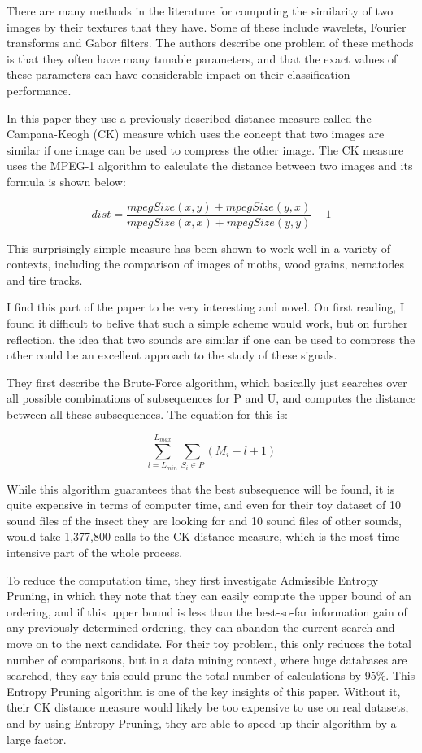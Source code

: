 There are many methods in the literature for computing the similarity
of two images by their textures that they have.  Some of these include
wavelets, Fourier transforms and Gabor filters.  The authors describe
one problem of these methods is that they often have many tunable
parameters, and that the exact values of these parameters can have
considerable impact on their classification performance.

In this paper they use a previously described distance measure called
the Campana-Keogh (CK) measure \cite{campana2010} which uses the
concept that two images are similar if one image can be used to
compress the other image.  The CK measure uses the MPEG-1 algorithm to
calculate the distance between two images and its formula is shown
below:

	\[ dist = \frac{mpegSize(x,y) + mpegSize(y,x)} {mpegSize(x,x) + mpegSize(y,y)} - 1 \]

This surprisingly simple measure has been shown to work well in a
variety of contexts, including the comparison of images of moths, wood
grains, nematodes and tire tracks\cite{campana2010}.

I find this part of the paper to be very interesting and novel.  On
first reading, I found it difficult to belive that such a simple
scheme would work, but on further reflection, the idea that two sounds
are similar if one can be used to compress the other could be an
excellent approach to the study of these signals.

They first describe the Brute-Force algorithm, which basically just
searches over all possible combinations of subsequences for P and U,
and computes the distance between all these subsequences.  The
equation for this is:

	\[ \sum^{L_{max}}_{l=L_{min}} \sum_{S_i \in { P }} (M_i - l + 1) \]

While this algorithm guarantees that the best subsequence will be
found, it is quite expensive in terms of computer time, and even for
their toy dataset of 10 sound files of the insect they are looking for
and 10 sound files of other sounds, would take 1,377,800 calls to the
CK distance measure, which is the most time intensive part of the
whole process.

To reduce the computation time, they first investigate Admissible
Entropy Pruning, in which they note that they can easily compute the
upper bound of an ordering, and if this upper bound is less than the
best-so-far information gain of any previously determined ordering,
they can abandon the current search and move on to the next candidate.
For their toy problem, this only reduces the total number of
comparisons, but in a data mining context, where huge databases are
searched, they say this could prune the total number of calculations
by 95\%.  This Entropy Pruning algorithm is one of the key insights of
this paper.  Without it, their CK distance measure would likely be too
expensive to use on real datasets, and by using Entropy Pruning, they
are able to speed up their algorithm by a large factor.

